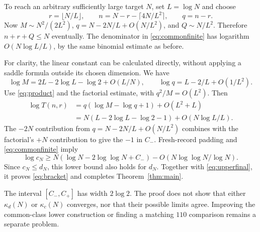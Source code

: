 To reach an arbitrary sufficiently large target $N$, set $L=\log N$ and choose
\begin{equation}\label{eq:commonparameters}
 r=\lfloor N/L\rfloor,\qquad
 n=N-r-\lceil4N/L^2\rceil,\qquad q=n-r.
\end{equation}
Now $M\sim N^2/(2L^2)$, $q=N-2N/L+O(N/L^2)$, and $Q\sim N/L^2$. Therefore $n+r+Q\le N$ eventually. The denominator in \eqref{eq:commonfinite} has logarithm $O(N\log L/L)$, by the same binomial estimate as before.

For clarity, the linear constant can be calculated directly, without applying a saddle formula outside its chosen dimension. We have
\[
 \log M=2L-2\log L-\log2+O(L/N),\qquad
 \log q=L-2/L+O(1/L^2).
\]
Use \eqref{eq:product} and the factorial estimate, with $q^2/M=O(L^2)$. Then
\begin{align*}
 \log T(n,r)
 &=q(\log M-\log q+1)+O(L^2+L)\\
 &=N(L-2\log L-\log2-1)+O(N\log L/L).
\end{align*}
The $-2N$ contribution from $q=N-2N/L+O(N/L^2)$ combines with the factorial's $+N$ contribution to give the $-1$ in $C_-$. Fresh-record padding and \eqref{eq:commonfinite} imply
\begin{equation}\label{eq:commonlower}
 \log c_N\ge N(\log N-2\log\log N+C_-)
                   -O(N\log\log N/\log N).
\end{equation}
Since $c_N\le d_N$, this lower bound also holds for $d_N$. Together with \eqref{eq:upperfinal}, it proves \eqref{eq:bracket} and completes Theorem~\ref{thm:main}.

The interval $[C_-,C_+]$ has width $2\log2$. The proof does not show that either $\kappa_d(N)$ or $\kappa_c(N)$ converges, nor that their possible limits agree. Improving the common-class lower construction or finding a matching $110$ comparison remains a separate problem.
